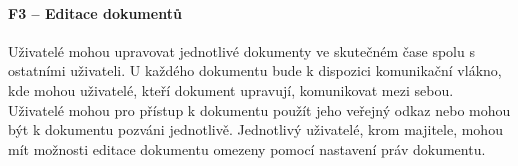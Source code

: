 \paragraph{F3 -- Editace dokumentů}

Uživatelé mohou upravovat jednotlivé dokumenty ve skutečném čase spolu s ostatními uživateli.
U každého dokumentu bude k dispozici komunikační vlákno, kde mohou uživatelé, kteří dokument upravují, komunikovat mezi sebou.
Uživatelé mohou pro přístup k dokumentu použít jeho veřejný odkaz nebo mohou být k dokumentu pozváni jednotlivě.
Jednotlivý uživatelé, krom majitele, mohou mít možnosti editace dokumentu omezeny pomocí nastavení práv dokumentu.
